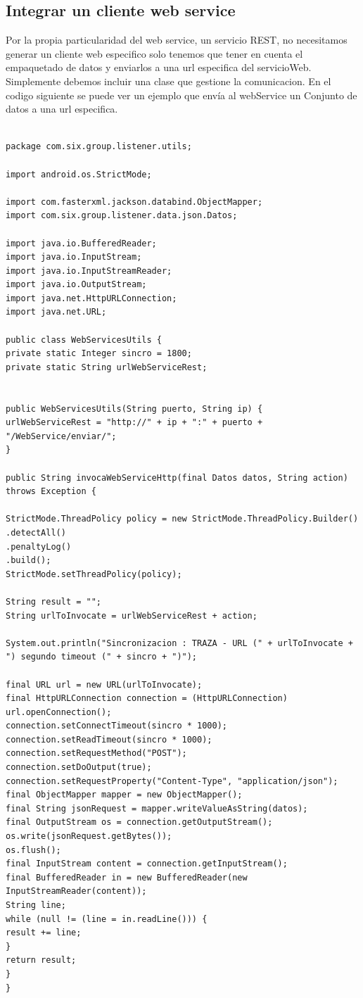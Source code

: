 \subsection{Integrar un cliente web service}

Por la propia particularidad del web service, un servicio REST, no necesitamos generar un cliente web especifico solo tenemos que tener en cuenta el empaquetado de datos y enviarlos a una url especifica del servicioWeb. Simplemente debemos incluir una clase que gestione la comunicacion. En el codigo siguiente se puede ver un ejemplo que envía al webService un Conjunto de datos a una url especifica.

\begin{lstlisting}[style=JAVA]

package com.six.group.listener.utils;

import android.os.StrictMode;

import com.fasterxml.jackson.databind.ObjectMapper;
import com.six.group.listener.data.json.Datos;

import java.io.BufferedReader;
import java.io.InputStream;
import java.io.InputStreamReader;
import java.io.OutputStream;
import java.net.HttpURLConnection;
import java.net.URL;

public class WebServicesUtils {
private static Integer sincro = 1800;
private static String urlWebServiceRest;


public WebServicesUtils(String puerto, String ip) {
urlWebServiceRest = "http://" + ip + ":" + puerto + "/WebService/enviar/";
}

public String invocaWebServiceHttp(final Datos datos, String action) throws Exception {

StrictMode.ThreadPolicy policy = new StrictMode.ThreadPolicy.Builder()
.detectAll()
.penaltyLog()
.build();
StrictMode.setThreadPolicy(policy);

String result = "";
String urlToInvocate = urlWebServiceRest + action;

System.out.println("Sincronizacion : TRAZA - URL (" + urlToInvocate + ") segundo timeout (" + sincro + ")");

final URL url = new URL(urlToInvocate);
final HttpURLConnection connection = (HttpURLConnection) url.openConnection();
connection.setConnectTimeout(sincro * 1000);
connection.setReadTimeout(sincro * 1000);
connection.setRequestMethod("POST");
connection.setDoOutput(true);
connection.setRequestProperty("Content-Type", "application/json");
final ObjectMapper mapper = new ObjectMapper();
final String jsonRequest = mapper.writeValueAsString(datos);
final OutputStream os = connection.getOutputStream();
os.write(jsonRequest.getBytes());
os.flush();
final InputStream content = connection.getInputStream();
final BufferedReader in = new BufferedReader(new InputStreamReader(content));
String line;
while (null != (line = in.readLine())) {
result += line;
}
return result;
}
}

\end{lstlisting}


